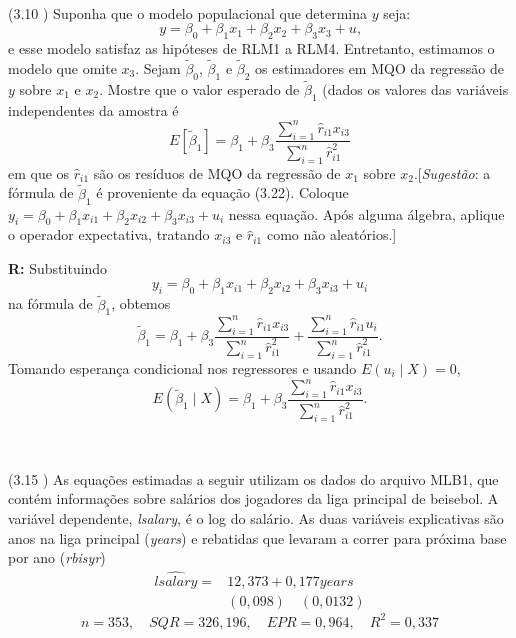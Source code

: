 \documentclass[12pt,letterpaper, onecolumn]{exam}
\renewenvironment{solution}
  {\par\noindent\textbf{R:}\enspace\color{blue}}
  {\par\color{black}}
\begin{document}
\begin{questions}
\
\


    \question (3.10 \citep{wooldridge2010}) Suponha que o modelo populacional que determina $y$ seja: \begin{equation*}
        y = \beta_0 + \beta_1x_1 + \beta_2x_2 + \beta_3x_3 + u \text{,}
    \end{equation*} e esse modelo satisfaz as hipóteses de RLM1 a RLM4. Entretanto, estimamos o modelo que omite $x_3$. Sejam $\tilde\beta_0$, $\tilde\beta_1$ e $\tilde\beta_2$ os estimadores em MQO da regressão de $y$ sobre $x_1$ e $x_2$. Mostre que o valor esperado de $\tilde\beta_1$ (dados os valores das variáveis independentes da amostra é \begin{equation*}
        E[\tilde\beta_1] = \beta_1 + \beta_3\frac{\sum^n_{i=1}\hat r_{i1}x_{i3}}{\sum^n_{i=1}\hat r^2_{i1}}
    \end{equation*} em que os $\hat r_{i1}$ são os resíduos de MQO da regressão de $x_1$ sobre $x_2$.[\textit{Sugestão}: a fórmula de $\tilde\beta_1$ é proveniente da equação (3.22). Coloque $y_i = \beta_0 + \beta_1x_{i1} + \beta_2x_{i2}+\beta_3x_{i3} + u_i$ nessa equação. Após alguma álgebra, aplique o operador expectativa, tratando $x_{i3}$ e $\hat r_{i1}$ como não aleatórios.]
    \begin{solution}
Substituindo
\[
y_i=\beta_0+\beta_1x_{i1}+\beta_2x_{i2}+\beta_3x_{i3}+u_i
\]
na fórmula de \(\tilde\beta_1\), obtemos
\[
\tilde\beta_1
=
\beta_1+\beta_3\frac{\sum_{i=1}^n \hat r_{i1}x_{i3}}{\sum_{i=1}^n \hat r_{i1}^2}
+\frac{\sum_{i=1}^n \hat r_{i1}u_i}{\sum_{i=1}^n \hat r_{i1}^2}.
\]
Tomando esperança condicional nos regressores e usando \(E(u_i\mid X)=0\),
\[
E(\tilde\beta_1\mid X)
=
\beta_1+\beta_3\frac{\sum_{i=1}^n \hat r_{i1}x_{i3}}{\sum_{i=1}^n \hat r_{i1}^2}.
\]
\end{solution}
\
\
\


\question\qstar (3.15 \citep{wooldridge2016}) As equações estimadas a seguir utilizam os dados do arquivo MLB1, que contém informações sobre salários dos jogadores da liga principal de beisebol. A variável dependente, \textit{lsalary}, é o log do salário. As duas variáveis explicativas são anos na liga principal (\textit{years}) e rebatidas que levaram a correr para próxima base por ano (\textit{rbisyr})\begin{equation*}\begin{split}
        \widehat{lsalary} = &12,373 + 0,177 years\\
        \quad & (0,098) \quad(0,0132) \end{split}
\end{equation*}\begin{equation*}
    n = 353, \quad SQR = 326,196, \quad EPR = 0,964, \quad R^2 = 0,337
\end{equation*}



\end{questions}
\end{document}
